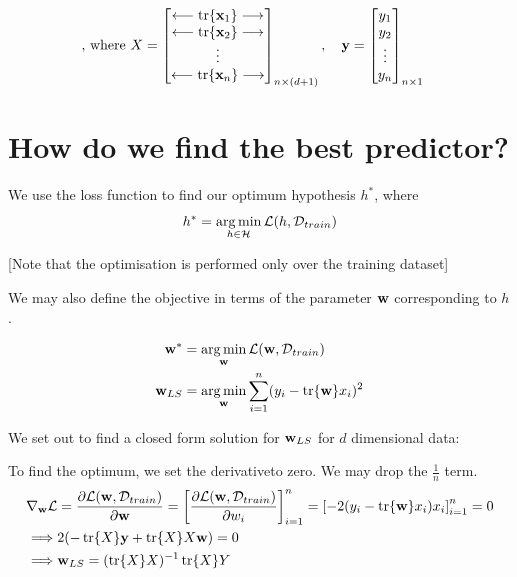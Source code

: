 $$
  \text{, where } X =
  \begin{bmatrix}
    \longleftarrow{\tr{\mathbf{x}_1}} \longrightarrow \\
    \longleftarrow \tr{\mathbf{x}_2} \longrightarrow  \\
    \vdots                                    \\
    \longleftarrow \tr{\mathbf{x}_n} \longrightarrow
  \end{bmatrix}_{n\times (d+1)}, \quad
  \mathbf{y} =
  \begin{bmatrix}
    y_1    \\
    y_2    \\
    \vdots \\
    y_n
  \end{bmatrix}_{n\times 1}\quad
$$

\section{How do we find the best predictor?}

We use the loss function to find our optimum hypothesis $h^*$, where
$$
  h^* = \operatorname*{arg\,min}_{h \in \mathcal{H}} \mathcal{L}(h,\mathcal{D}_{train})
$$

[Note that the optimisation is performed only over the training dataset]

We may also define the objective in terms of the parameter $\mathbf{w}$ corresponding to $h$.

\begin{align*}
  \mathbf{w}^*    & = \operatorname*{arg\,min}_{\mathbf{w}} \mathcal{L}(\mathbf{w},\mathcal{D}_{train})            \\
  \mathbf{w}_{LS} & = \operatorname*{arg\,min}_{\mathbf{w}} \sum_{i=1}^n(y_i-\tr{\mathbf{w}} x_i)^2
\end{align*}

We set out to find a closed form solution for \(\mathbf{w}_{LS}\) for $d$ dimensional data:

To find the optimum, we set the derivative\footnotemark[1] to zero. We may drop the \(\frac{1}{n}\) term.
\begin{align*}
  \nabla_{\mathbf{w}}\mathcal{L} & = \frac{\partial{\mathcal{L}(\mathbf{w},\mathcal{D}_{train})}}{\partial{\mathbf{w}}} = \left[\frac{\partial{\mathcal{L}(\mathbf{w},\mathcal{D}_{train})}}{\partial{w_i}}\right]_{i=1}^n = \left[-2(y_i-\tr{\mathbf{w}} x_i)x_i\right]_{i=1}^n = 0 \\
  \implies       & 2(-\tr{X} \mathbf{y} + \tr{X} X\mathbf{w}) =0                                                                                                                                                       \\
  \implies       & \mathbf{w}_{LS} = (\tr{X} X)^{-1}\tr{X} Y
\end{align*}

